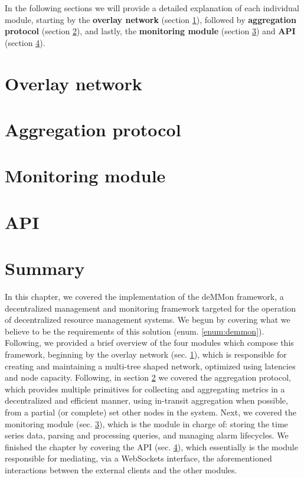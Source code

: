 In the following sections we will provide a detailed explanation of each individual module, starting by the \textbf{overlay network} (section \ref{sec:overlay_network}), followed by \textbf{aggregation protocol} (section \ref{sec:mon_protocol}), and lastly, the \textbf{monitoring module} (section \ref{sec:mon_module}) and \textbf{API} (section \ref{sec:api}). 

\section{Overlay network} 
\label{sec:overlay_network}


\section{Aggregation protocol}
\label{sec:mon_protocol}


\section{Monitoring module}
\label{sec:mon_module}


\section{API}
\label{sec:api}


\section{Summary}


In this chapter, we covered the implementation of the deMMon framework, a decentralized management and monitoring framework targeted for the operation of decentralized resource management systems. We begun by covering what we believe to be the requirements of this solution (enum. \ref{enum:demmon}). Following, we provided a brief overview of the four modules which compose this framework, beginning by the overlay network (sec. \ref{sec:overlay_network}), which is responsible for creating and maintaining a multi-tree shaped network, optimized using latencies and node capacity. Following, in section \ref{sec:mon_protocol} we covered the aggregation protocol, which provides multiple primitives for collecting and aggregating metrics in a decentralized and efficient manner, using in-transit aggregation when possible, from a partial (or complete) set other nodes in the system. Next, we covered the monitoring module (sec. \ref{sec:mon_module}), which is the module in charge of: storing the time series data, parsing and processing queries, and managing alarm lifecycles. We finished the chapter by covering the API (sec. \ref{sec:api}), which essentially is the module responsible for mediating, via a WebSockets interface, the aforementioned interactions between the external clients and the other modules.